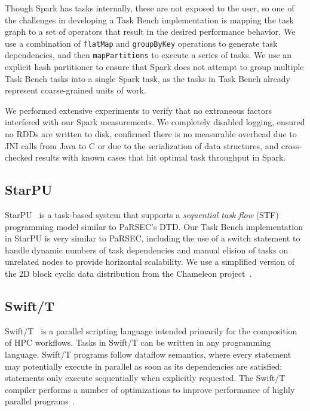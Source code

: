 Though Spark has tasks internally, these are not exposed to the user,
so one of the challenges in developing a Task Bench implementation is
mapping the task graph to a set of operators that result in the
desired performance behavior. We use a combination of
\lstinline[language=Scala]{flatMap} and
\lstinline[language=Scala]{groupByKey} operations to generate task
dependencies, and then \lstinline[language=Scala]{mapPartitions} to execute a
series of tasks. We use an explicit hash partitioner to ensure that
Spark does not attempt to group multiple Task Bench tasks into a
single Spark task, as the tasks in Task Bench already represent coarse-grained units of work.

We performed extensive experiments to verify that no
extraneous factors interfered with our Spark measurements. We
completely disabled logging, ensured no RDDs are written
to disk, confirmed there is no measurable overhead due to JNI
calls from Java to C or due to the serialization of data structures, and cross-checked results with known cases
that hit optimal task throughput in Spark.

\subsection{StarPU}

StarPU~\cite{StarPU11} is a task-based system that supports a \emph{sequential task flow} (STF)
programming model similar to PaRSEC's DTD. Our Task Bench implementation in
StarPU is very similar to PaRSEC, including the use of a switch
statement to handle dynamic numbers of task dependencies and manual
elision of tasks on unrelated nodes to provide horizontal scalability.
We use a simplified version of the 2D block cyclic data distribution from the Chameleon 
project~\cite{Chameleon}.

\subsection{Swift/T}

Swift/T~\cite{Wozniak13} is a parallel scripting language intended
primarily for the composition of HPC workflows. Tasks in Swift/T can be written in any
programming language. Swift/T
programs follow dataflow semantics, where every statement may
potentially execute in parallel as soon as its dependencies are
satisfied; statements only execute sequentially when explicitly
requested. The Swift/T compiler performs a number of optimizations to
improve performance of highly parallel programs~\cite{Armstrong14}.

